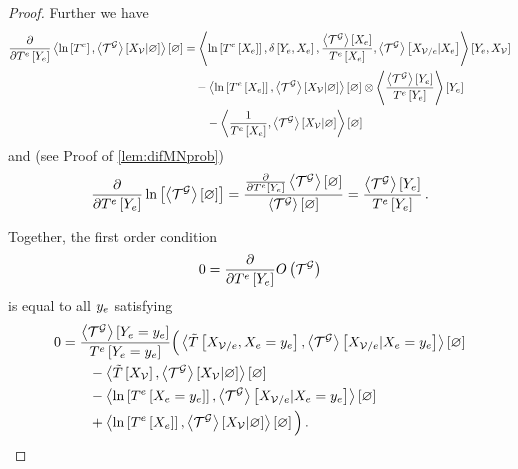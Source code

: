 \begin{proof}
    Further we have
    \begin{align*}
        \frac{\partial }{\partial T^{e}\left[Y_{e}\right]} \left\langle  \ln \left[ T^{e} \right], \left\langle \mathcal{T}^{\mathcal{G}}\right\rangle \left[ X_{\mathcal{V}} | \varnothing \right]\right\rangle \left[ \varnothing \right]
        & = \left\langle \ln \left[ T^{e}\left[X_{e}\right] \right],
            \delta\left[Y_{e},X_{e}\right],
            \frac{\left\langle \mathcal{T}^{\mathcal{G}}\right\rangle \left[ X_{e} \right]}{T^{e}\left[X_{e}\right]},
            \left\langle \mathcal{T}^{\mathcal{G}}\right\rangle \left[ X_{\mathcal{V}/e} | X_{e} \right] \right\rangle \left[ Y_{e},X_{\mathcal{V}} \right] \\
        & \quad -  \left\langle \ln \left[ T^{e}\left[X_{e}\right] \right],\left\langle \mathcal{T}^{\mathcal{G}}\right\rangle \left[ X_{\mathcal{V}} | \varnothing \right]\right\rangle \left[ \varnothing \right]
        \otimes \left\langle \frac{\left\langle \mathcal{T}^{\mathcal{G}}\right\rangle \left[ Y_{e} \right]}{T^{e}\left[Y_{e}\right]}
        \right\rangle \left[ Y_{e} \right] \\
        & \quad\quad - \left\langle  \frac{1}{T^{e}\left[X_{e}\right]}, \left\langle \mathcal{T}^{\mathcal{G}}\right\rangle \left[ X_{\mathcal{V}} | \varnothing \right]\right\rangle \left[ \varnothing \right]
    \end{align*}
    and (see Proof of \ref{lem:difMNprob})
    \begin{align*}
        \frac{\partial }{\partial T^{e}\left[Y_{e}\right]} \ln \left[ \left\langle \mathcal{T}^{\mathcal{G}}\right\rangle \left[ \varnothing \right] \right]
        = \frac{\frac{\partial }{\partial T^{e}\left[Y_{e}\right]} \left\langle \mathcal{T}^{\mathcal{G}}\right\rangle \left[ \varnothing \right]}{\left\langle \mathcal{T}^{\mathcal{G}}\right\rangle \left[ \varnothing \right]}
        = \frac{\left\langle \mathcal{T}^{\mathcal{G}}\right\rangle \left[ Y_{e} \right]}{T^{e}\left[Y_{e}\right]} \, .
    \end{align*}

    Together, the first order condition
    \begin{align*}
        0 = \frac{\partial }{\partial T^{e}\left[Y_{e}\right]} O\left(\mathcal{T}^{\mathcal{G}}\right)
    \end{align*}
    is equal to all $y_{e}$ satisfying%
    \begin{align*}
        0 & = \frac{\left\langle \mathcal{T}^{\mathcal{G}}\right\rangle \left[ Y_{e}=y_{e} \right]}{T^{e}\left[Y_{e}=y_{e}\right]}
        \Big(
        \left\langle \tilde{T}\left[X_{\mathcal{V}/e},X_{e}=y_{e}\right], \left\langle \mathcal{T}^{\mathcal{G}}\right\rangle \left[ X_{\mathcal{V}/e} | X_{e}=y_{e} \right]\right\rangle \left[ \varnothing \right] \\
        &\quad \quad - \left\langle \tilde{T}\left[X_{\mathcal{V}}\right], \left\langle \mathcal{T}^{\mathcal{G}}\right\rangle \left[ X_{\mathcal{V}} | \varnothing \right]\right\rangle \left[ \varnothing \right]  \\
        &\quad \quad - \left\langle \ln \left[ T^{e}\left[X_{e}=y_{e}\right] \right], \left\langle \mathcal{T}^{\mathcal{G}}\right\rangle \left[ X_{\mathcal{V}/e} | X_{e}=y_{e} \right]\right\rangle \left[ \varnothing \right] \\
        &\quad \quad + \left\langle \ln \left[ T^{e}\left[X_{e}\right] \right], \left\langle \mathcal{T}^{\mathcal{G}}\right\rangle \left[ X_{\mathcal{V}} | \varnothing \right]\right\rangle \left[ \varnothing \right]
        \Big) \, .
    \end{align*}


\end{proof}
